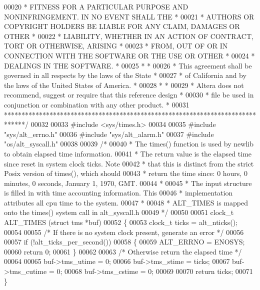 \begin{DoxyCode}
00020 \textcolor{comment}{* FITNESS FOR A PARTICULAR PURPOSE AND NONINFRINGEMENT. IN NO EVENT SHALL THE *}
00021 \textcolor{comment}{* AUTHORS OR COPYRIGHT HOLDERS BE LIABLE FOR ANY CLAIM, DAMAGES OR OTHER      *}
00022 \textcolor{comment}{* LIABILITY, WHETHER IN AN ACTION OF CONTRACT, TORT OR OTHERWISE, ARISING     *}
00023 \textcolor{comment}{* FROM, OUT OF OR IN CONNECTION WITH THE SOFTWARE OR THE USE OR OTHER         *}
00024 \textcolor{comment}{* DEALINGS IN THE SOFTWARE.                                                   *}
00025 \textcolor{comment}{*                                                                             *}
00026 \textcolor{comment}{* This agreement shall be governed in all respects by the laws of the State   *}
00027 \textcolor{comment}{* of California and by the laws of the United States of America.              *}
00028 \textcolor{comment}{*                                                                             *}
00029 \textcolor{comment}{* Altera does not recommend, suggest or require that this reference design    *}
00030 \textcolor{comment}{* file be used in conjunction or combination with any other product.          *}
00031 \textcolor{comment}{******************************************************************************/}
00032 
00033 \textcolor{preprocessor}{#include <sys/times.h>}
00034 
00035 \textcolor{preprocessor}{#include "sys/alt_errno.h"}
00036 \textcolor{preprocessor}{#include "sys/alt_alarm.h"}
00037 \textcolor{preprocessor}{#include "os/alt_syscall.h"}
00038 
00039 \textcolor{comment}{/*}
00040 \textcolor{comment}{ * The times() function is used by newlib to obtain elapsed time information.}
00041 \textcolor{comment}{ * The return value is the elapsed time since reset in system clock ticks. Note}
00042 \textcolor{comment}{ * that this is distinct from the strict Posix version of times(), which should}
00043 \textcolor{comment}{ * return the time since: 0 hours, 0 minutes, 0 seconds, January 1, 1970, GMT.}
00044 \textcolor{comment}{ *}
00045 \textcolor{comment}{ * The input structure is filled in with time accounting information. This }
00046 \textcolor{comment}{ * implementation attributes all cpu time to the system.}
00047 \textcolor{comment}{ *}
00048 \textcolor{comment}{ * ALT\_TIMES is mapped onto the times() system call in alt\_syscall.h}
00049 \textcolor{comment}{ */}
00050  
00051 clock\_t ALT_TIMES (\textcolor{keyword}{struct} tms *buf)
00052 \{
00053   clock\_t ticks = alt_nticks(); 
00054 
00055   \textcolor{comment}{/* If there is no system clock present, generate an error */}
00056 
00057   \textcolor{keywordflow}{if} (!alt_ticks_per_second())
00058   \{
00059     ALT_ERRNO = ENOSYS;
00060     \textcolor{keywordflow}{return} 0;
00061   \}
00062 
00063   \textcolor{comment}{/* Otherwise return the elapsed time */}
00064 
00065   buf->tms\_utime  = 0;
00066   buf->tms\_stime  = ticks;
00067   buf->tms\_cutime = 0;
00068   buf->tms\_cstime = 0;
00069 
00070   \textcolor{keywordflow}{return} ticks;
00071 \}
\end{DoxyCode}

